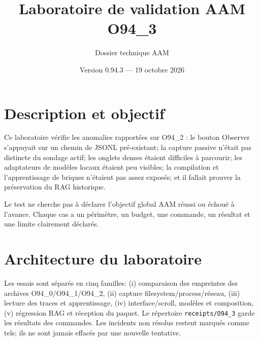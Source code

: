 \documentclass[11pt,a4paper]{article}
\title{Laboratoire de validation AAM O94\_3}
\author{Dossier technique AAM}
\date{Version 0.94.3 — 19 octobre 2026}
\begin{document}
\maketitle
\tableofcontents
\section{Description et objectif}
Ce laboratoire vérifie les anomalies rapportées sur O94\_2 : le bouton Observer s'appuyait sur un chemin de JSONL pré-existant; la capture passive n'était pas distincte du sondage actif; les onglets denses étaient difficiles à parcourir; les adaptateurs de modèles locaux étaient peu visibles; la compilation et l'apprentissage de briques n'étaient pas assez exposés; et il fallait prouver la préservation du RAG historique.

Le test ne cherche pas à déclarer l'objectif global AAM réussi ou échoué à l'avance. Chaque cas a un périmètre, un budget, une commande, un résultat et une limite clairement déclarés.

\section{Architecture du laboratoire}
Les essais sont séparés en cinq familles: (i) comparaison des empreintes des archives O94\_0/O94\_1/O94\_2, (ii) capture filesystem/process/réseau, (iii) lecture des traces et apprentissage, (iv) interface/scroll, modèles et composition, (v) régression RAG et réception du paquet. Le répertoire \texttt{receipts/O94\_3} garde les résultats des commandes. Les incidents non résolus restent marqués comme tels; ils ne sont jamais effacés par une nouvelle tentative.
\end{document}
